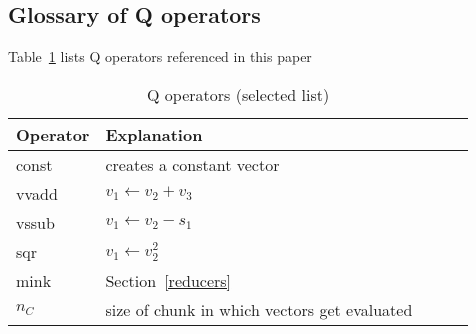 \subsection{Glossary of Q operators}

Table~\ref{tbl_qops} lists Q operators referenced in this paper
\begin{table}
\centering
\begin{tabular}{|l|l|l|l|l|} \hline \hline
  {\bf Operator} & {\bf Explanation} \\ \hline \hline
  const & creates a constant vector \\ \hline
  vvadd & \(v_1 \leftarrow v_2 + v_3\) \\ \hline
  vssub & \(v_1 \leftarrow v_2 - s_1\) \\ \hline
  sqr & \(v_1 \leftarrow v_2^2\) \\ \hline
  mink & Section~\ref{reducers} \\ \hline
  \(n_C\) & size of chunk in which vectors get evaluated \\ \hline
  \hline
\end{tabular}
\caption{Q operators (selected list)}
\label{tbl_qops}
\end{table}

